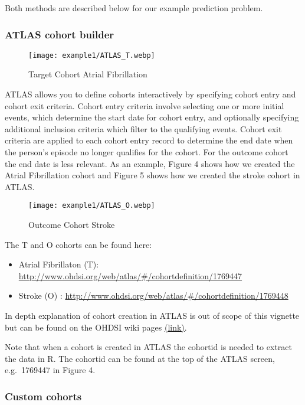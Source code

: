 \documentclass[
]{article}
\providecommand{\tightlist}{%
  \setlength{\itemsep}{0pt}\setlength{\parskip}{0pt}}
\begin{document}
Both methods are described below for our example prediction problem.

\hypertarget{atlas-cohort-builder}{%
\subsubsection{ATLAS cohort builder}\label{atlas-cohort-builder}}

\begin{figure}
\centering
\texttt{[image: example1/ATLAS\_T.webp]}
\caption{Target Cohort Atrial Fibrillation}
\end{figure}

ATLAS allows you to define cohorts interactively by specifying cohort
entry and cohort exit criteria. Cohort entry criteria involve selecting
one or more initial events, which determine the start date for cohort
entry, and optionally specifying additional inclusion criteria which
filter to the qualifying events. Cohort exit criteria are applied to
each cohort entry record to determine the end date when the person's
episode no longer qualifies for the cohort. For the outcome cohort the
end date is less relevant. As an example, Figure 4 shows how we created
the Atrial Fibrillation cohort and Figure 5 shows how we created the
stroke cohort in ATLAS.

\begin{figure}
\centering
\texttt{[image: example1/ATLAS\_O.webp]}
\caption{Outcome Cohort Stroke}
\end{figure}

The T and O cohorts can be found here:

\begin{itemize}
\tightlist
\item
  Atrial Fibrillaton (T):
  \url{http://www.ohdsi.org/web/atlas/\#/cohortdefinition/1769447}
\item
  Stroke (O) :
  \url{http://www.ohdsi.org/web/atlas/\#/cohortdefinition/1769448}
\end{itemize}

In depth explanation of cohort creation in ATLAS is out of scope of this
vignette but can be found on the OHDSI wiki pages
\href{http://www.ohdsi.org/web/wiki/doku.php?id=documentation:software:atlas}{(link)}.

Note that when a cohort is created in ATLAS the cohortid is needed to
extract the data in R. The cohortid can be found at the top of the ATLAS
screen, e.g.~1769447 in Figure 4.

\hypertarget{custom-cohorts}{%
\subsubsection{Custom cohorts}\label{custom-cohorts}}
\end{document}
